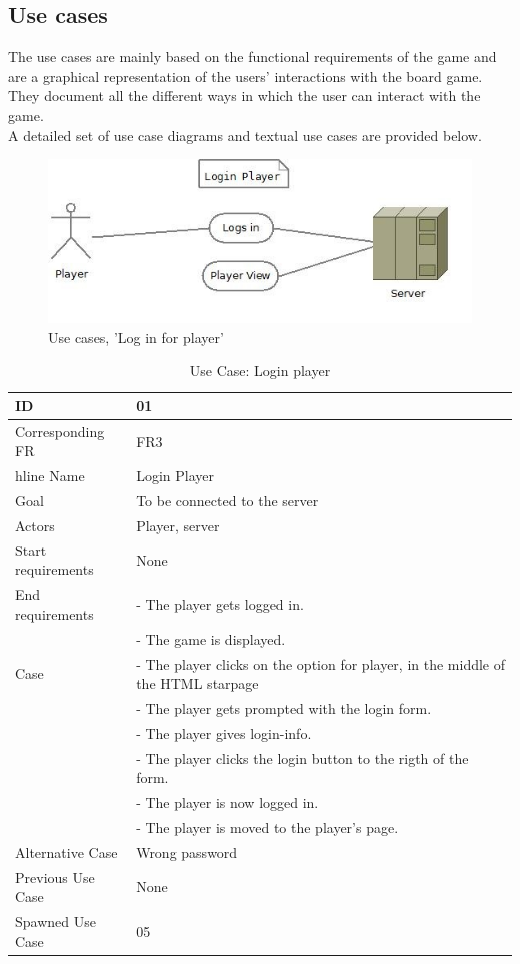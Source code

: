 \subsection{Use cases}
The use cases are mainly based on the functional requirements of the game and are a graphical representation of the users’ interactions with the board game. They document all the different ways in which the user can interact with the game. 
\\
A detailed set of use case diagrams and textual use cases are provided below.\\


\begin{figure}[H]
  \centering
    \includegraphics[width=1.0\textwidth]{img/loginplayer.jpg}
  \caption{Use cases, 'Log in for player'} 
  \label{fig:loginplayer}
\end{figure}


\begin{table}[H]
\begin{tabular}{|l|p{14cm}|} \hline
	\textbf{ID} & \textbf{01}\\ \hline
	Corresponding FR & FR3\\hline
	Name & Login Player\\ \hline
	Goal & To be connected to the server\\ \hline
	Actors & Player, server\\ \hline
	Start requirements & None\\ \hline
	End requirements & - The player gets logged in.\\
					 & - The game is displayed.\\ \hline
	Case & - The player clicks on the option for player, in the middle of the HTML starpage\\
			& - The player gets prompted with the login form. \\
		 	& - The player gives login-info.\\
			& - The player clicks the login button to the rigth of the form.\\
			& - The player is now logged in.\\ 
			& - The player is moved to the player's page. \\ \hline
	Alternative Case & Wrong password\\ \hline
	Previous Use Case & None\\ \hline
	Spawned Use Case & 05\\ \hline
\end{tabular}
\caption{Use Case: Login player}
\label{fig:usecase01table}
\end{table}


